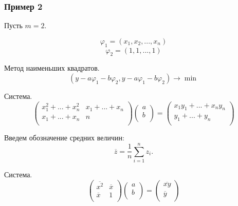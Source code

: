 \documentclass[10pt]{beamer}
\begin{document}
\begin{frame}[fragile]
\frametitle{Пример 2}
Пусть $m = 2$.

$$\varphi_1 = (x_1, x_2, ..., x_n)$$ 
$$\varphi_2 = (1, 1, ..., 1)$$ 

Метод наименьших квадратов.
$$(y - a \varphi_1 - b \varphi_2, y - a \varphi_1 - b \varphi_2) \to \min$$ 

Система.
$$
\begin{pmatrix}
x_1^2 + ... + x_n^2 & x_1 + ... + x_n \\
x_1 + ... + x_n & n \\
\end{pmatrix}
\begin{pmatrix}
a \\
b \\
\end{pmatrix}
=
\begin{pmatrix}
x_1 y_1 + ... + x_n y_n \\
y_1 + ... + y_n  \\
\end{pmatrix}
$$ 

Введем обозначение средних величин:
$$\overline{z} = \frac{1}{n} \sum_{i=1}^{n} {z_i} .$$

Система.
$$
\begin{pmatrix}
\overline{x^2} & \overline{x} \\
\overline{x} & 1 \\
\end{pmatrix}
\begin{pmatrix}
a \\
b \\
\end{pmatrix}
=
\begin{pmatrix}
\overline{x y} \\
\overline{y}  \\
\end{pmatrix}
$$ 
\end{frame}
\end{document}
